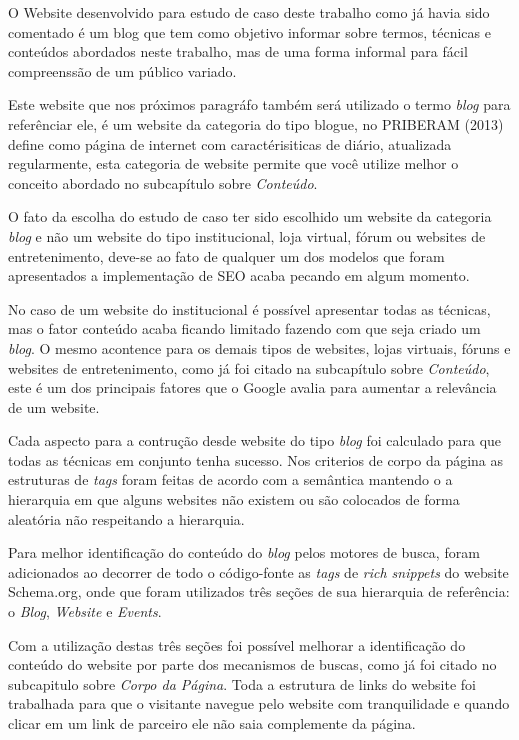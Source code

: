 \documentclass[
	12pt,				%
	openright,			%
	twoside,			%
	a4paper,			%
	english,			%
	french,				%
	spanish,			%
	brazil				%
	]{abntex2}
\begin{document}
O Website desenvolvido para estudo de caso deste trabalho como já havia sido comentado é um blog que tem como objetivo informar sobre termos, técnicas e conteúdos abordados neste trabalho, mas de uma forma informal para fácil compreenssão de um público variado.

Este website que nos próximos paragráfo também será utilizado o termo \textit{blog} para referênciar ele, é um website da categoria do tipo blogue, no PRIBERAM (2013) define como página de internet com caractérisiticas de diário, atualizada regularmente, esta categoria de website permite que você utilize melhor o conceito abordado no subcapítulo sobre \textit{Conteúdo}.

O fato da escolha do estudo de caso ter sido escolhido um website da categoria \textit{blog} e não um website do tipo institucional, loja virtual, fórum ou websites de entretenimento, deve-se ao fato de qualquer um dos modelos que foram apresentados a implementação de SEO acaba pecando em algum momento.

No caso de um website do institucional é possível apresentar todas as técnicas, mas o fator conteúdo acaba ficando limitado fazendo com que seja criado um \textit{blog}. O mesmo acontence para os demais tipos de websites, lojas virtuais, fóruns e websites de entretenimento, como já foi citado na subcapítulo sobre \textit{Conteúdo}, este é um dos principais fatores que o Google avalia para aumentar a relevância de um website.

Cada aspecto para a contrução desde website do tipo \textit{blog} foi calculado para que todas as técnicas em conjunto tenha sucesso. Nos criterios de corpo da página as estruturas de \textit{tags} foram feitas de acordo com a semântica mantendo o a hierarquia em que alguns websites não existem ou são colocados de forma aleatória não respeitando a hierarquia.

Para melhor identificação do conteúdo do \textit{blog} pelos motores de busca, foram adicionados ao decorrer de todo o código-fonte as \textit{tags} de \textit{rich snippets} do website Schema.org, onde que foram utilizados três seções de sua hierarquia de referência: o \textit{Blog}, \textit{Website} e \textit{Events}.

Com a utilização destas três seções foi possível melhorar a identificação do conteúdo do website por parte dos mecanismos de buscas, como já foi citado no subcapitulo sobre \textit{Corpo da Página}. Toda a estrutura de links do website foi trabalhada para que o visitante navegue pelo website com tranquilidade e quando clicar em um link de parceiro ele não saia complemente da página.
\end{document}

